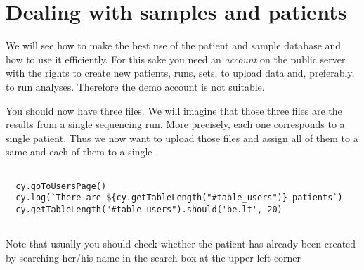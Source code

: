 \section{Dealing with samples and patients}
We will see how to make the best use of the patient and sample database and
how to use it efficiently.
For this sake you need an \textit{account} on the public server with the rights to create new patients,
runs, sets, to upload data and, preferably, to run analyses.
Therefore the demo account is not suitable.




You should now have three files. We will imagine that those three files are
the results from a single sequencing run. More precisely, each one corresponds to
a single patient. Thus we now want to upload those files and assign all of
them to a same  and each of them to a single .

\begin{verbatim}

  cy.goToUsersPage()
  cy.log(`There are ${cy.getTableLength("#table_users")} patients`)
  cy.getTableLength("#table_users").should('be.lt', 20)


\end{verbatim}

Note that usually you should check whether the patient has
already been created by searching her/his name in the search box at the
upper left corner

